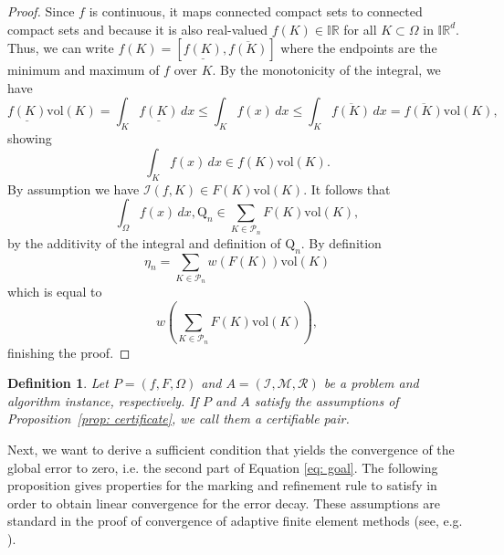 \documentclass[a4paper, 11pt]{article}
\newtheorem{definition}[theorem]{Definition}
\newcommand{\vol}{\mathrm{vol}}
\begin{document}
	\begin{proof}
		Since $f$ is continuous, it maps connected compact sets to connected compact sets and because it is also real-valued $f(K)\in \mathbb{IR}$ for all $K \subset\Omega$ in $\mathbb{IR}^d$. Thus, we can write $f(K)= [\underline{f(K)}, \overline{f(K)}]$ where the endpoints are the minimum and maximum of $f$ over $K$. By the monotonicity of the integral{,} we have
		$$\underline{f(K)}\vol(K) = \int_K \underline{f(K)}\, dx \leq \int_{K} f(x) \, dx \leq \int_K \overline{f(K)}\, dx = \overline{f(K)}\vol(K), $$
		showing 
		$$\int_K f(x) \, dx  \in f(K)\vol(K). $$
		By assumption we have $\mathcal{I}(f,K)\in F(K)\vol(K)$. It follows that
		$$ \int_\Omega f(x) \, dx, \mathrm{Q}_n \in \sum_{K \in \mathcal{P}_n} F(K) \vol(K),$$
		by the additivity of the integral and definition of $\mathrm{Q}_n$. By definition
		$$ \eta_n = \sum_{K \in \mathcal{P}_n} w(F(K)) \vol(K) $$
		which is equal to 
		$$ w\left(\sum_{K \in \mathcal{P}_n} F(K) \vol(K) \right), $$
		finishing the proof.
	\end{proof}
	
	
	\begin{definition}
		Let $P=(f,F,\Omega)$ and $A=(\mathcal{I},\mathcal{M}, \mathcal{R})$ be a problem and {algorithm} instance, respectively. If $P$ and $A$ satisfy the assumptions of Proposition~\ref{prop: certificate}, we call them a certifiable pair.
	\end{definition}    
	
	Next, we want to derive a sufficient condition that yields the convergence of the global error to zero, i.e. the second part of Equation \eqref{eq: goal}. The following proposition gives properties for the marking and refinement rule to satisfy in order to obtain linear convergence for the error decay. These assumptions are standard in the proof of convergence of adaptive finite element methods (see, e.g. \cite[Sec.~1.14]{verfurth2013posteriori}).
	
\end{document}
